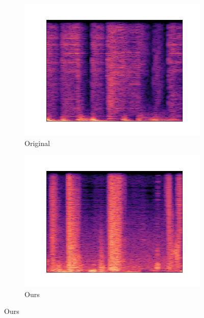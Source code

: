 \documentclass{article}
\begin{document}
\begin{figure}%
\centering
\begin{subfigure}[b]{0.2\textwidth}
\centering
\includegraphics[width=\textwidth]{examples/original.wav.png}
\caption{Original}
\end{subfigure} \hfill

\begin{subfigure}[b]{0.2\textwidth}
\centering
\includegraphics[width=\textwidth]{examples/temporal_audio_vae.wav.png}
\caption{Ours}
\end{subfigure} \hfill



\end{figure}
\end{document}
